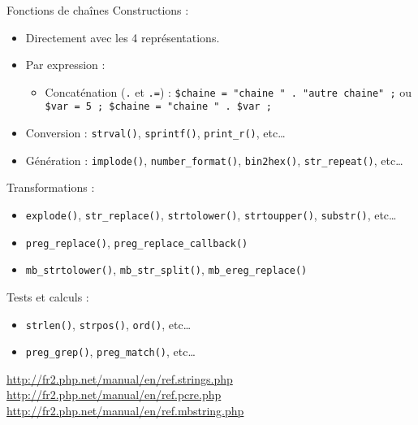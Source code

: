 \begin{frame}[containsverbatim]{Fonctions de chaînes}
	Constructions :
	\begin{itemize}
		\item Directement avec les 4 représentations.
		\item Par expression :
		\begin{itemize}
			\item Concaténation (\texttt{.} et \texttt{.=}) : \lstinline~$chaine = "chaine " . "autre chaine" ;~ ou \lstinline~$var = 5 ; $chaine = "chaine " . $var ;~
		\end{itemize}
		\item Conversion : \lstinline~strval()~, \lstinline~sprintf()~, \lstinline~print_r()~, etc\ldots
		\item Génération : \lstinline~implode()~, \lstinline~number_format()~, \lstinline~bin2hex()~, \lstinline~str_repeat()~, etc\ldots
	\end{itemize}
	Transformations :
	\begin{itemize}
		\item \lstinline~explode()~, \lstinline~str_replace()~, \lstinline~strtolower()~, \lstinline~strtoupper()~, \lstinline~substr()~, etc\ldots
		\item \lstinline~preg_replace()~, \lstinline~preg_replace_callback()~
		\item \lstinline~mb_strtolower()~, \lstinline~mb_str_split()~, \lstinline~mb_ereg_replace()~
	\end{itemize}
		Tests et calculs :
	\begin{itemize}
		\item \lstinline~strlen()~, \lstinline~strpos()~, \lstinline~ord()~, etc\ldots
		\item \lstinline~preg_grep()~, \lstinline~preg_match()~, etc\ldots
	\end{itemize}
	\url{http://fr2.php.net/manual/en/ref.strings.php}\\
	\url{http://fr2.php.net/manual/en/ref.pcre.php}\\
	\url{http://fr2.php.net/manual/en/ref.mbstring.php}\\
\end{frame}

